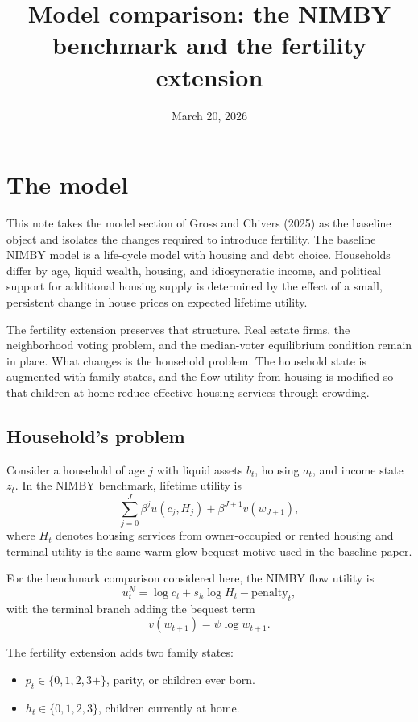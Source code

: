 \documentclass[11pt]{article}
\title{Model comparison: the NIMBY benchmark and the fertility extension}
\date{March 20, 2026}
\begin{document}
\maketitle

\section{The model}

This note takes the model section of Gross and Chivers (2025) as the baseline object and isolates
the changes required to introduce fertility. The baseline NIMBY model is a life-cycle model with
housing and debt choice. Households differ by age, liquid wealth, housing, and idiosyncratic
income, and political support for additional housing supply is determined by the effect of a
small, persistent change in house prices on expected lifetime utility.

The fertility extension preserves that structure. Real estate firms, the neighborhood voting
problem, and the median-voter equilibrium condition remain in place. What changes is the
household problem. The household state is augmented with family states, and the flow utility from
housing is modified so that children at home reduce effective housing services through crowding.

\subsection{Household's problem}

Consider a household of age $j$ with liquid assets $b_t$, housing $a_t$, and income state $z_t$.
In the NIMBY benchmark, lifetime utility is
\begin{equation}
\sum_{j=0}^{J}\beta^{j}u(c_j, H_j) + \beta^{J+1}v(w_{J+1}),
\end{equation}
where $H_t$ denotes housing services from owner-occupied or rented housing and terminal utility is
the same warm-glow bequest motive used in the baseline paper.

For the benchmark comparison considered here, the NIMBY flow utility is
\begin{equation}
u^{N}_t = \log c_t + s_h \log H_t - \text{penalty}_t,
\end{equation}
with the terminal branch adding the bequest term
\begin{equation}
v(w_{t+1}) = \psi \log w_{t+1}.
\end{equation}

The fertility extension adds two family states:
\begin{itemize}
\item $p_t \in \{0,1,2,3+\}$, parity, or children ever born.
\item $h_t \in \{0,1,2,3\}$, children currently at home.
\end{itemize}
\end{document}
